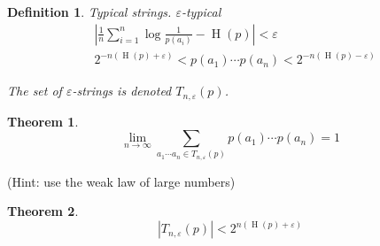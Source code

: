 \documentclass[aps,pra,onecolumn,notitlepage,superscriptaddress]{revtex4-1}
\newcommand{\op}[1]{\operatorname{#1}}
\newtheorem{theo}{Theorem}
\newtheorem{defi}{Definition}
\begin{document}
    \begin{defi}
        Typical strings. $\varepsilon$-typical
        \begin{align*}
            & \left|\frac{1}{n} \sum_{i=1}^n \log \frac{1}{p(a_i)} - \op H(p) \right| < \varepsilon \\
            &  2^{-n(\op H(p) + \varepsilon)} < p(a_1) \cdots p(a_n) < 2^{-n(\op H(p)-\varepsilon)}
        \end{align*}

        The set of $\varepsilon$-strings is denoted $T_{n,\varepsilon}(p)$.
    \end{defi}

    \begin{theo}
        \begin{equation}
            \lim_{n \to \infty} \sum_{a_1 \cdots a_n \in T_{n,\varepsilon}(p)} p(a_1) \cdots p(a_n) = 1
        \end{equation}
    \end{theo}
    (Hint: use the weak law of large numbers)

    \begin{theo}
        \begin{equation}
            |T_{n,\varepsilon}(p)| < 2^{n(\op H(p)+\varepsilon)}
        \end{equation}
    \end{theo}
\end{document}
